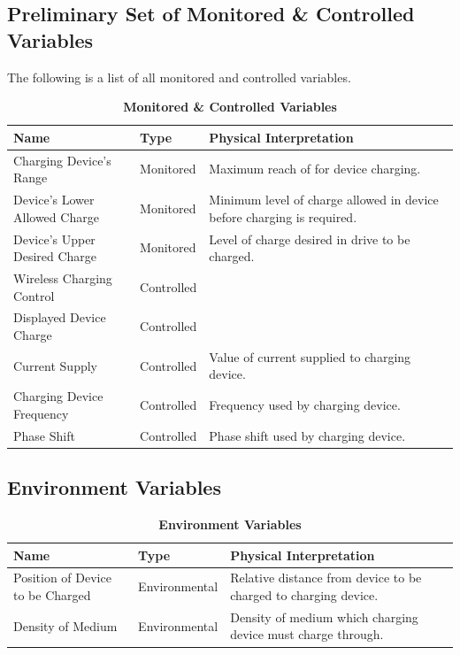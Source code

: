 \documentclass[12pt, titlepage]{article}
\begin{document}
\subsection{Preliminary Set of Monitored \& Controlled Variables}
The following is a list of all monitored and controlled variables.
\begin{table}[htp]
\caption{\bf Monitored \& Controlled Variables}
    \begin{tabular}{|p{4cm}|p{3cm}|p{7cm}|}
         \hline
         \bf Name & \bf Type & \bf Physical Interpretation\\
         \hline
         Charging Device's Range & Monitored & Maximum reach of for device charging.\\
         \hline
         Device's Lower Allowed Charge & Monitored & Minimum level of charge allowed in device before charging is required.\\
         \hline
         Device's Upper Desired Charge & Monitored & Level of charge desired in drive to be charged.\\
         \hline
         Wireless Charging Control & Controlled & \\
         \hline
         Displayed Device Charge & Controlled & \\
         \hline
         Current Supply & Controlled & Value of current supplied to charging device.\\
         \hline
         Charging Device Frequency & Controlled & Frequency used by charging device.\\
         \hline
         Phase Shift & Controlled & Phase shift used by charging device.\\
         \hline
    \end{tabular}
\end{table}


\subsection{Environment Variables}
\begin{table}[H]
\caption{\bf Environment Variables}
\begin{tabular}{ |p{4cm}|p{3cm}|p{7cm}|} 
 \hline
\bf Name & \bf Type & \bf Physical Interpretation\\
 \hline
 Position of Device to be Charged & Environmental & Relative distance from device to be charged to charging device.\\
 \hline
 Density of Medium & Environmental & Density of medium which charging device must charge through.\\
\hline
\end{tabular}
\end{table}
 
\end{document}
